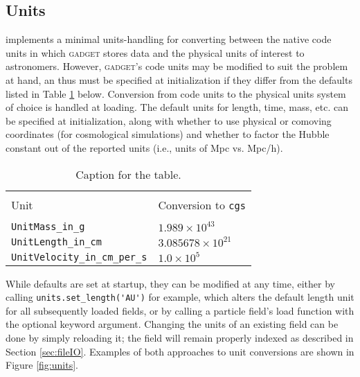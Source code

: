 \subsection{Units}
\label{sec:units}
 implements a minimal units-handling for converting between the native code units in which \textsc{gadget} stores data and the physical units of interest to astronomers.  
However, \textsc{gadget}'s code units may be modified to suit the problem at hand, an thus must be specified at  initialization if they differ from the defaults listed in Table \ref{code_unit_defaults} below.
Conversion from code units to the physical units system of choice is handled at loading.
The default units for length, time, mass, etc. can be specified at initialization, along with whether to use physical or comoving coordinates (for cosmological simulations) and whether to factor the Hubble constant out of the reported units (i.e., units of Mpc vs. Mpc/h).

\begin{table}[h!]
    \begin{tabular}{ll}
     \centering
      \caption{Caption for the table.}
      \label{code_unit_defaults}
        \hline \hline \\
        Unit & Conversion to \verb|cgs|\\
        \hline \\
        \verb|UnitMass_in_g| &  $1.989\times10^{43}$\\ 
        \verb|UnitLength_in_cm| & $3.085678\times10^{21}$ \\ 
        \verb|UnitVelocity_in_cm_per_s| & $1.0\times10^5$ \\ 
    \end{tabular} 
\end{table}

While defaults are set at startup, they can be modified at any time, either by calling \verb|units.set_length('AU')| for example, which alters the default length unit for all subsequently loaded fields, or by calling a particle field's load function with the optional  keyword argument.  
Changing the units of an existing field can be done by simply reloading it; the field will remain properly indexed as described in Section \ref{sec:fileIO}. Examples of both approaches to unit conversions are shown in Figure \ref{fig:units}.